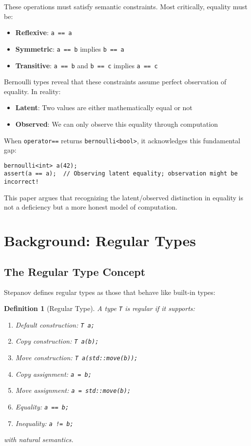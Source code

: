\documentclass[11pt,final,hidelinks]{article}
\newtheorem{definition}[theorem]{Definition}
\newcommand{\code}[1]{\texttt{#1}}
\begin{document}
These operations must satisfy semantic constraints. Most critically, equality must be:
\begin{itemize}
    \item \textbf{Reflexive}: \code{a == a}
    \item \textbf{Symmetric}: \code{a == b} implies \code{b == a}
    \item \textbf{Transitive}: \code{a == b} and \code{b == c} implies \code{a == c}
\end{itemize}

Bernoulli types reveal that these constraints assume perfect observation of equality. In reality:
\begin{itemize}
    \item \textbf{Latent}: Two values are either mathematically equal or not
    \item \textbf{Observed}: We can only observe this equality through computation
\end{itemize}

When \code{operator==} returns \code{bernoulli<bool>}, it acknowledges this fundamental gap:
\begin{verbatim}
bernoulli<int> a(42);
assert(a == a);  // Observing latent equality; observation might be incorrect!
\end{verbatim}

This paper argues that recognizing the latent/observed distinction in equality is not a deficiency but a more honest model of computation.

\section{Background: Regular Types}

\subsection{The Regular Type Concept}

Stepanov defines regular types as those that behave like built-in types:

\begin{definition}[Regular Type]
A type \code{T} is regular if it supports:
\begin{enumerate}
    \item Default construction: \code{T a;}
    \item Copy construction: \code{T a(b);}
    \item Move construction: \code{T a(std::move(b));}
    \item Copy assignment: \code{a = b;}
    \item Move assignment: \code{a = std::move(b);}
    \item Equality: \code{a == b;}
    \item Inequality: \code{a != b;}
\end{enumerate}
with natural semantics.
\end{definition}
\end{document}

